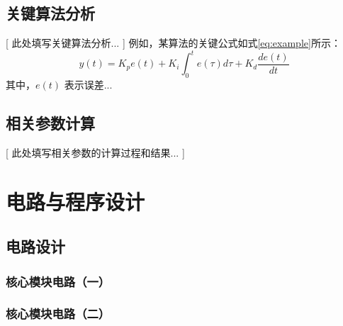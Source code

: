 \documentclass[UTF-8,zihao=-4]{ctexart}
\begin{document}
\subsection{关键算法分析}
    [ 此处填写关键算法分析... ]
    例如，某算法的关键公式如式\ref{eq:example}所示：
    \begin{equation} \label{eq:example}
        y(t) = K_p e(t) + K_i \int_0^t e(\tau)d\tau + K_d \frac{de(t)}{dt}
    \end{equation}
    其中，$e(t)$ 表示误差... %

\subsection{相关参数计算}
    [ 此处填写相关参数的计算过程和结果... ]
    
\section{电路与程序设计}
\subsection{电路设计}
\subsubsection{核心模块电路（一）}
    
\subsubsection{核心模块电路（二）}
\end{document}

